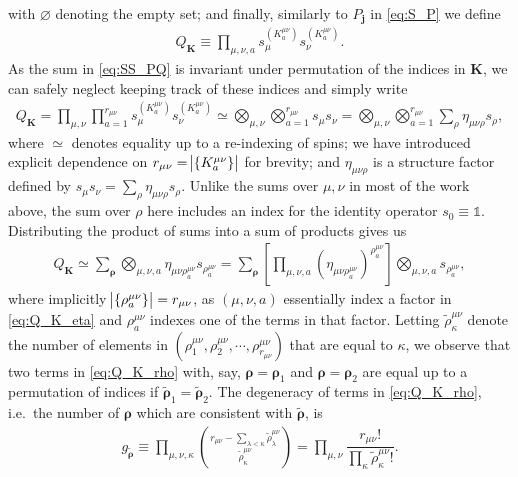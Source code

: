 \documentclass[pra,reprint,longbibliography]{revtex4-1}
\newcommand{\f}[2]{\dfrac{#1}{#2}} %
\newcommand{\p}[1]{\left(#1\right)} %
\renewcommand{\sp}[1]{\left[#1\right]} %
\renewcommand{\set}[1]{\left\{#1\right\}} %
\renewcommand{\v}{\bm} %
\newcommand{\1}{\mathds{1}}
\begin{document}
with $\varnothing$ denoting the empty set; and finally, similarly to
$P_{\v j}$ in \eqref{eq:S_P} we define
\begin{align}
  Q_{\v K} \equiv \prod_{\mu,\nu,a}
  s_\mu^{(K^{\mu\nu}_a)} s_\nu^{(K^{\mu\nu}_a)}.
\end{align}
As the sum in \eqref{eq:SS_PQ} is invariant under permutation of the
indices in $\v K$, we can safely neglect keeping track of these
indices and simply write
\begin{align}
  Q_{\v K}
  = \prod_{\mu,\nu} \prod_{a=1}^{r_{\mu\nu}}
  s_\mu^{(K^{\mu\nu}_a)} s_\nu^{(K^{\mu\nu}_a)}
  \simeq \bigotimes_{\mu,\nu} \bigotimes_{a=1}^{r_{\mu\nu}} s_\mu s_\nu
  = \bigotimes_{\mu,\nu} \bigotimes_{a=1}^{r_{\mu\nu}}
  \sum_\rho \eta_{\mu\nu\rho} s_\rho,
  \label{eq:Q_K_eta}
\end{align}
where $\simeq$ denotes equality up to a re-indexing of spins; we have
introduced explicit dependence on
$r_{\mu\nu}=\abs{\set{K^{\mu\nu}_a}}$ for brevity; and
$\eta_{\mu\nu\rho}$ is a structure factor defined by
$s_\mu s_\nu=\sum_\rho\eta_{\mu\nu\rho}s_\rho$.  Unlike the sums over
$\mu,\nu$ in most of the work above, the sum over $\rho$ here includes
an index for the identity operator $s_0\equiv\1$.  Distributing the
product of sums into a sum of products gives us
\begin{align}
  Q_{\v K}
  \simeq \sum_{\v\rho} \bigotimes_{\mu,\nu,a}
  \eta_{\mu\nu\rho^{\mu\nu}_a} s_{\rho^{\mu\nu}_a}
  = \sum_{\v\rho} \sp{\prod_{\mu,\nu,a}
    \p{\eta_{\mu\nu\rho^{\mu\nu}_a}}^{\rho^{\mu\nu}_a}}
  \bigotimes_{\mu,\nu,a} s_{\rho^{\mu\nu}_a},
  \label{eq:Q_K_rho}
\end{align}
where implicitly $\abs{\set{\rho^{\mu\nu}_a}}=r_{\mu\nu}$, as
$\p{\mu,\nu,a}$ essentially index a factor in \eqref{eq:Q_K_eta} and
$\rho^{\mu\nu}_a$ indexes one of the terms in that factor.  Letting
$\tilde\rho^{\mu\nu}_\kappa$ denote the number of elements in
$\p{\rho^{\mu\nu}_1,\rho^{\mu\nu}_2,\cdots,\rho^{\mu\nu}_{r_{\mu\nu}}}$
that are equal to $\kappa$, we observe that two terms in
\eqref{eq:Q_K_rho} with, say, $\v\rho=\v\rho_1$ and $\v\rho=\v\rho_2$
are equal up to a permutation of indices if
$\tilde{\v\rho}_1=\tilde{\v\rho}_2$.  The degeneracy of terms in
\eqref{eq:Q_K_rho}, i.e.~the number of $\v\rho$ which are consistent
with $\tilde{\v\rho}$, is
\begin{align}
  g_{\tilde{\v\rho}}
  \equiv \prod_{\mu,\nu,\kappa}
  { r_{\mu\nu} - \sum_{\lambda<\kappa} \tilde\rho^{\mu\nu}_\lambda
    \choose \tilde\rho^{\mu\nu}_\kappa }
  = \prod_{\mu,\nu}
  \f{r_{\mu\nu}!}{\prod_\kappa\tilde\rho^{\mu\nu}_\kappa!}.
\end{align}
\end{document}

